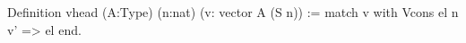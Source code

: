 Definition vhead (A:Type) (n:nat) 
           (v: vector A (S n)) :=
match v with
  Vcons el n v' => el
end.